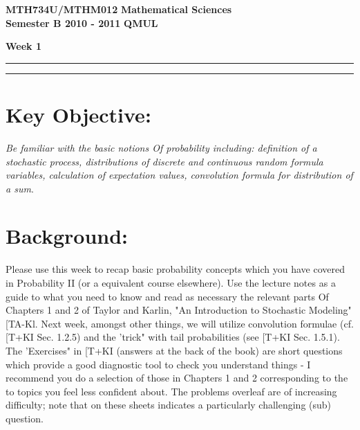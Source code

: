 \documentclass[11pt,a4paper]{article}
\begin{document}
  \textbf{MTH734U/MTHM012} \hfill \textbf{Mathematical Sciences}\\
  \textbf{Semester B 2010 - 2011} \hfill \textbf{QMUL}
  \begin{center}
    \textbf{\Huge Week 1}
  \end{center}
  \hrule \vspace{2mm} \hrule
  \section*{Key Objective:}
  \textit{Be familiar with the basic notions Of probability including: definition of a stochastic process, distributions of discrete and continuous random formula variables, calculation of expectation values, convolution formula for distribution of a sum}.
  \section*{Background:}
  Please use this week to recap basic probability concepts which you have covered in Probability II (or a equivalent course elsewhere). Use the lecture notes as a guide to what you need to know and read as necessary the relevant parts Of Chapters 1 and 2 of Taylor and Karlin, "An Introduction to Stochastic Modeling" [TA-Kl. Next week, amongst other things, we will utilize convolution formulae (cf. [T+KI Sec. 1.2.5) and the 'trick" with tail probabilities (see [T+KI Sec. 1.5.1). The 'Exercises" in [T+KI (answers at the back of the book) are short questions which provide a good diagnostic tool to check you understand things - I recommend you do a selection of those in Chapters 1 and 2 corresponding to the to topics you feel less confident about. The problems overleaf are of increasing difficulty; note that on these sheets indicates a particularly challenging (sub) question.
\end{document}
